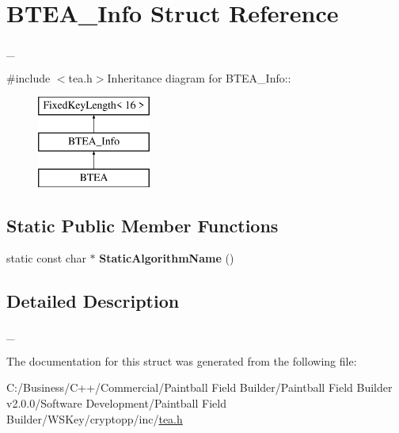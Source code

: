 \hypertarget{struct_b_t_e_a___info}{
\section{BTEA\_\-Info Struct Reference}
\label{struct_b_t_e_a___info}
}


\_\-  


{\ttfamily \#include $<$tea.h$>$}Inheritance diagram for BTEA\_\-Info::\begin{figure}[H]
\begin{center}
\leavevmode
\includegraphics[height=3cm]{struct_b_t_e_a___info}
\end{center}
\end{figure}
\subsection*{Static Public Member Functions}
\begin{DoxyCompactItemize}
\item 
\hypertarget{struct_b_t_e_a___info_aa3241a3e4afa48b3196f6a3daa04f8f7}{
static const char $\ast$ {\bfseries StaticAlgorithmName} ()}
\label{struct_b_t_e_a___info_aa3241a3e4afa48b3196f6a3daa04f8f7}

\end{DoxyCompactItemize}


\subsection{Detailed Description}
\_\- 

The documentation for this struct was generated from the following file:\begin{DoxyCompactItemize}
\item 
C:/Business/C++/Commercial/Paintball Field Builder/Paintball Field Builder v2.0.0/Software Development/Paintball Field Builder/WSKey/cryptopp/inc/\hyperlink{tea_8h}{tea.h}\end{DoxyCompactItemize}
